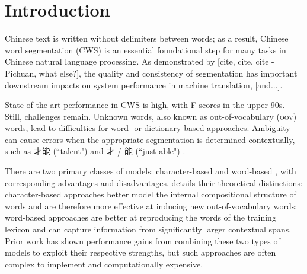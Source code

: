 \section{Introduction}

Chinese text is written without delimiters between words; as a result, Chinese word segmentation (CWS) is an essential foundational step for many tasks in Chinese natural language processing. As demonstrated by [cite, cite, cite - Pichuan, what else?], the quality and consistency of segmentation has important downstream impacts on system performance in machine translation, [and...].

State-of-the-art performance in CWS is high, with F-scores in the upper 90s. %
Still, challenges remain. Unknown words, also known as out-of-vocabulary (\textsc{oov}) words, lead to difficulties for word- or dictionary-based approaches.
Ambiguity can cause errors when the appropriate segmentation is determined contextually, such as 才能 (``talent") and 才 / 能 (``just able") \cite{Gao:2003:ACL}.

There are two primary classes of models: character-based \cite{Xue:2003:IJCLCLP,Tseng:2005:SIGHAN,Zhang:2006:HLT-NAACL,Wang:2010:COLING} and word-based \cite{Andrew:2006:EMNLP,Zhang:2007:ACL}, with corresponding advantages and disadvantages. \cite{Sun:2010:COLING} details their theoretical distinctions: character-based approaches better model the internal compositional structure of words and are therefore more effective at inducing new out-of-vocabulary words; word-based approaches are better at reproducing the words of the training lexicon and can capture information from significantly larger contextual spans. Prior work has shown performance gains from combining these two types of models to exploit their respective strengths, but such approaches are often complex to implement and computationally expensive.

